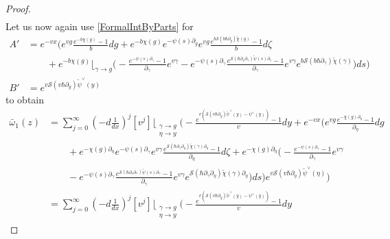 \documentclass[10pt,a4paper,oneside,no-math,reqno]{amsart}%
\theoremstyle{plain}
\theoremstyle{definition}
\theoremstyle{remark}
\numberwithin{equation}{section}
\newcommand{\mc}[1]{\mathcal{#1}}
\newcommand{\1}{\mathds{1}}
\newcommand{\<}{\langle}
\renewcommand{\>}{\rangle}
\newcommand{\del}{\partial}
\begin{document}
\begin{proof}
\begin{equation}
\begin{split}
		\end{split}
	\end{equation}
	Let us now again use \cref{FormalIntByParts} for
	\begin{equation}
		\begin{split}
			A'
			&=
			e^{-vx} 
			\bigg( e^{vg} \frac{ e^{-b \chi (g)} -1 }{b} dg 
    	+
    	e^{-b \chi (g)}
    	e^{-\psi (s) \del_g}e^{vg} \frac{e^{b \mc{S}(b \hbar \del_g) \tilde{\chi} (g)} - 1}{b} d\zeta
    	\\
			& \qquad
			+ 
			e^{-b \chi (g)} \Big\lfloor_{\gamma \to g} \Big(
      - \frac{e^{-\psi (s) \del_\gamma} - 1}{\del_\gamma} e^{v\gamma} 
      - 
    	e^{-\psi (s) \del_\gamma} \frac{e^{ \mc{S}(\hbar \del_s \del_\gamma) \tilde{\psi}(s) \del_\gamma} - 1}{\del_\gamma} e^{v\gamma} e^{b \mc{S}(b\hbar \del_\gamma) \tilde{\chi}(\gamma) }
      \Big)
			ds \bigg)
			\\
			B'
			&=
			e^{v \mc{S}(v\hbar \del_{y}) \tilde{\psi}^\vee(y) }
		\end{split}
	\end{equation}
	to obtain
	\begin{align}
			\bar{\omega}_1 (z)
      &=
      \sum_{j=0}^\infty (-d \frac{1}{dx})^j [v^j ] \Big\lfloor_{\substack{\gamma \to g \\ \eta \to y}}
			\Bigg(
      - \frac{e^{v ( \mc{S}(v\hbar \del_{y}) \tilde{\psi}^\vee(y) - \psi^\vee (y) )} - 1}{v} dy
      + 
      e^{-vx} 
			\bigg( e^{vg} \frac{ e^{- \chi (g) \del_\eta} -1 }{\del_\eta} dg 
			\nonumber
			\\
			&\qquad
			+
    	e^{- \chi (g) \del_\eta}
    	e^{-\psi (s) \del_\gamma}e^{v\gamma} \frac{e^{ \mc{S}( \hbar \del_\gamma \del_\eta) \tilde{\chi} (\gamma) \del_\eta} - 1}{\del_\eta} d\zeta
			+ 
			e^{- \chi (g) \del_\eta} \Big(
      - \frac{e^{-\psi (s) \del_\gamma} - 1}{\del_\gamma} e^{v\gamma} 
      \nonumber
      \\
      &\qquad
      - 
    	e^{-\psi (s) \del_\gamma} \frac{e^{ \mc{S}(\hbar \del_s \del_\gamma) \tilde{\psi}(s) \del_\gamma} - 1}{\del_\gamma} e^{v\gamma} e^{ \mc{S}(\hbar \del_\gamma \del_\eta) \tilde{\chi}(\gamma) \del_\eta }
      \Big)
			ds \bigg)
			e^{v \mc{S}(v\hbar \del_{\eta}) \tilde{\psi}^\vee(\eta) }
      \Bigg) 
      \nonumber
      \\
      &=
      \sum_{j=0}^\infty (-d \frac{1}{dx})^j [v^j ] \Big\lfloor_{\substack{\gamma \to g \\ \eta \to y}}
			\Bigg(
      - \frac{e^{v ( \mc{S}(v\hbar \del_{y}) \tilde{\psi}^\vee(y) - \psi^\vee (y) )} - 1}{v} dy

\end{align}
\end{proof}
\end{document}
